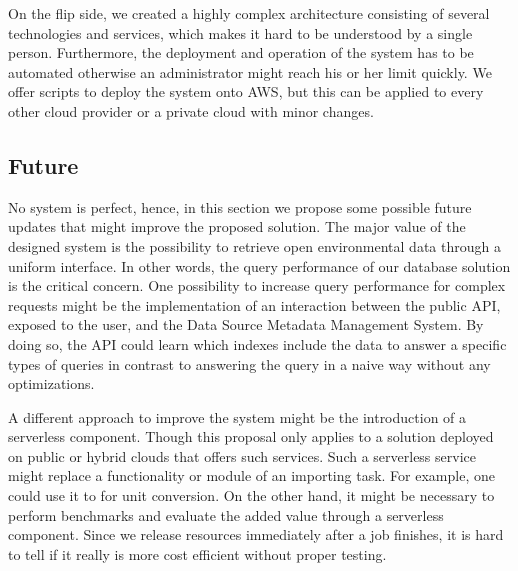 On the flip side, we created a highly complex architecture consisting of
several technologies and services, which makes it hard to be understood
by a single person. Furthermore, the deployment and operation of the
system has to be automated otherwise an administrator might reach his or her
limit quickly. We offer scripts to deploy the system onto AWS, but this
can be applied to every other cloud provider or a private cloud with
minor changes.

\subsection{Future}\label{future}

No system is perfect, hence, in this section we propose some possible
future updates that might improve the proposed solution. The major value
of the designed system is the possibility to retrieve open environmental
data through a uniform interface. In other words, the query performance
of our database solution is the critical concern. One possibility to increase
query performance for complex requests might be the implementation of an
interaction between the public API, exposed to the user, and the Data
Source Metadata Management System. By doing so, the API could learn
which indexes include the data to answer a specific types of queries
in contrast to answering the query in a naive way without any optimizations.

A different approach to improve the system might be the introduction of
a serverless component. Though this proposal only applies to a solution
deployed on public or hybrid clouds that offers such services. Such a
serverless service might replace a functionality or module of an
importing task. For example, one could use it to for unit conversion. On
the other hand, it might be necessary to perform benchmarks and evaluate
the added value through a serverless component. Since we release
resources immediately after a job finishes, it is hard to tell if it
really is more cost efficient without proper testing.
